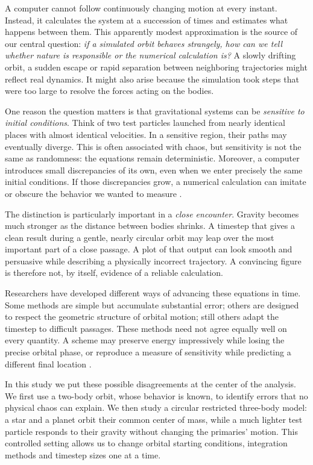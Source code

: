 \documentclass[10pt,letterpaper,twocolumn]{article}
\begin{document}
A computer cannot follow continuously changing motion at every instant. Instead, it calculates the system at a succession of times and estimates what happens between them. This apparently modest approximation is the source of our central question: \emph{if a simulated orbit behaves strangely, how can we tell whether nature is responsible or the numerical calculation is?} A slowly drifting orbit, a sudden escape or rapid separation between neighboring trajectories might reflect real dynamics. It might also arise because the simulation took steps that were too large to resolve the forces acting on the bodies.

One reason the question matters is that gravitational systems can be \emph{sensitive to initial conditions}. Think of two test particles launched from nearly identical places with almost identical velocities. In a sensitive region, their paths may eventually diverge. This is often associated with chaos, but sensitivity is not the same as randomness: the equations remain deterministic. Moreover, a computer introduces small discrepancies of its own, even when we enter precisely the same initial conditions. If those discrepancies grow, a numerical calculation can imitate or obscure the behavior we wanted to measure \cite{lichtenberg1992regular}.

The distinction is particularly important in a \emph{close encounter}. Gravity becomes much stronger as the distance between bodies shrinks. A timestep that gives a clean result during a gentle, nearly circular orbit may leap over the most important part of a close passage. A plot of that output can look smooth and persuasive while describing a physically incorrect trajectory. A convincing figure is therefore not, by itself, evidence of a reliable calculation.

Researchers have developed different ways of advancing these equations in time. Some methods are simple but accumulate substantial error; others are designed to respect the geometric structure of orbital motion; still others adapt the timestep to difficult passages. These methods need not agree equally well on every quantity. A scheme may preserve energy impressively while losing the precise orbital phase, or reproduce a measure of sensitivity while predicting a different final location \cite{hairer2006geometric,wisdom1991symplectic,rein2015ias15}.

In this study we put these possible disagreements at the center of the analysis. We first use a two-body orbit, whose behavior is known, to identify errors that no physical chaos can explain. We then study a circular restricted three-body model: a star and a planet orbit their common center of mass, while a much lighter test particle responds to their gravity without changing the primaries' motion. This controlled setting allows us to change orbital starting conditions, integration methods and timestep sizes one at a time.
\end{document}
